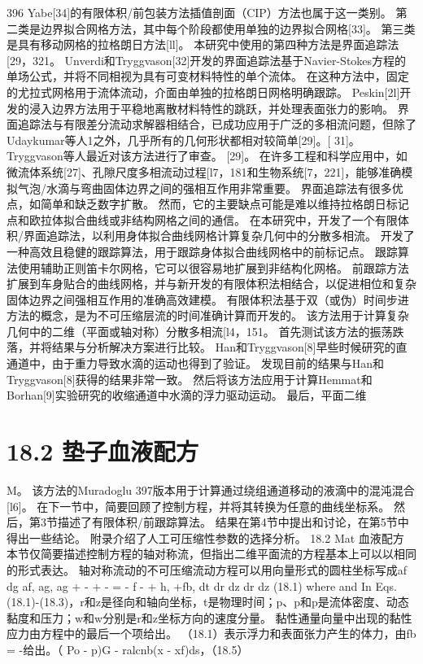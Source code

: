 \documentclass[UTF8,11pt,a4paper,openany,fontset=fandol]{ctexbook}
\begin{document}
396 Yabe[34]的有限体积/前包装方法插值剖面（CIP）方法也属于这一类别。 第二类是边界拟合网格方法，其中每个阶段都使用单独的边界拟合网格[33]。 第三类是具有移动网格的拉格朗日方法[ll]。 本研究中使用的第四种方法是界面追踪法[29，321。 Unverdi和Tryggvason[32]开发的界面追踪法基于Navier-Stokes方程的单场公式，并将不同相视为具有可变材料特性的单个流体。 在这种方法中，固定的尤拉式网格用于流体流动，介面由单独的拉格朗日网格明确跟踪。 Peskin[2l]开发的浸入边界方法用于平稳地离散材料特性的跳跃，并处理表面张力的影响。 界面追踪法与有限差分流动求解器相结合，已成功应用于广泛的多相流问题，但除了Udaykumar等人1之外，几乎所有的几何形状都相对较简单[29]。[ 31]。 Tryggvason等人最近对该方法进行了审查。 [29]。 在许多工程和科学应用中，如微流体系统[27]、孔隙尺度多相流动过程[l7，181和生物系统[7，221]，能够准确模拟气泡/水滴与弯曲固体边界之间的强相互作用非常重要。 界面追踪法有很多优点，如简单和缺乏数字扩散。 然而，它的主要缺点可能是难以维持拉格朗日标记点和欧拉体拟合曲线或非结构网格之间的通信。 在本研究中，开发了一个有限体积/界面追踪法，以利用身体拟合曲线网格计算复杂几何中的分散多相流。 开发了一种高效且稳健的跟踪算法，用于跟踪身体拟合曲线网格中的前标记点。 跟踪算法使用辅助正则笛卡尔网格，它可以很容易地扩展到非结构化网格。 前跟踪方法扩展到车身贴合的曲线网格，并与新开发的有限体积法相结合，以促进相位和复杂固体边界之间强相互作用的准确高效建模。 有限体积法基于双（或伪）时间步进方法的概念，是为不可压缩层流的时间准确计算而开发的。 该方法用于计算复杂几何中的二维（平面或轴对称）分散多相流[l4，151。 首先测试该方法的振荡跌落，并将结果与分析解决方案进行比较。 Han和Tryggvason[8]早些时候研究的直通道中，由于重力导致水滴的运动也得到了验证。 发现目前的结果与Han和Tryggvason[8]获得的结果非常一致。 然后将该方法应用于计算Hemmat和Borhan[9]实验研究的收缩通道中水滴的浮力驱动运动。 最后，平面二维

\section{18.2 垫子血液配方}
M。 该方法的Muradoglu 397版本用于计算通过绕组通道移动的液滴中的混沌混合[l6]。 在下一节中，简要回顾了控制方程，并将其转换为任意的曲线坐标系。 然后，第3节描述了有限体积/前跟踪算法。 结果在第4节中提出和讨论，在第5节中得出一些结论。 附录介绍了人工可压缩性参数的选择分析。 18.2 Mat 血液配方 本节仅简要描述控制方程的轴对称流，但指出二维平面流的方程基本上可以以相同的形式表达。 轴对称流动的不可压缩流动方程可以用向量形式的圆柱坐标写成af dg af, ag, ag + - + - = - f - + h, +fb, dt dr dz dr dz (18.1) where and In Eqs. (18.1)-(18.3)，r和z是径向和轴向坐标，t是物理时间；p、p和p是流体密度、动态黏度和压力；w和w分别是r和z坐标方向的速度分量。 黏性通量向量中出现的黏性应力由方程中的最后一个项给出。 （18.1）表示浮力和表面张力产生的体力，由fb = -给出。（ Po - p)G - ralcnb(x - xf)ds，（18.5）
\end{document}
